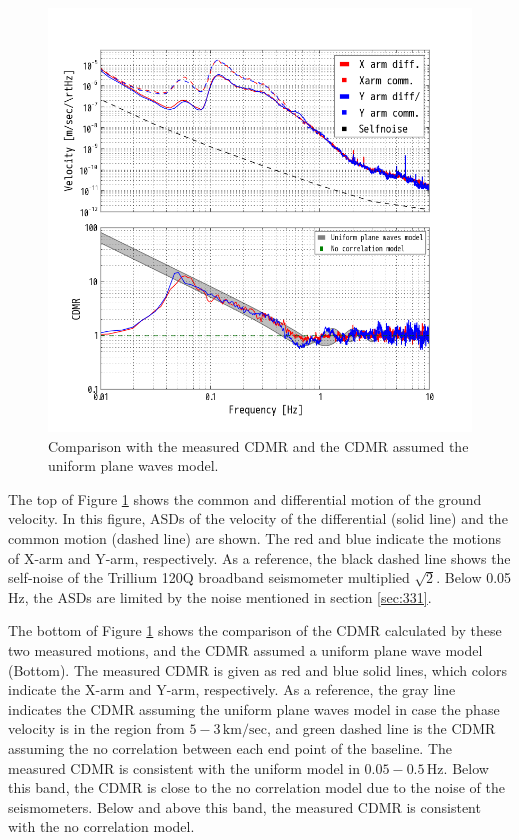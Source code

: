 \begin{figure}[h]
    \begin{center}   
      \includegraphics[width=13.0cm]{./img_chap3/img319.png}
      \caption{Comparison with the measured CDMR and the CDMR assumed the uniform plane waves model.}\label{img:img319}
    \end{center}
\end{figure}

The top of Figure \ref{img:img319} shows the common and differential motion of the ground velocity. In this figure, ASDs of the velocity of the differential (solid line) and the common motion (dashed line) are shown. The red and blue indicate the motions of X-arm and Y-arm, respectively. As a reference, the black dashed line shows the self-noise of the Trillium 120Q broadband seismometer multiplied $\sqrt{2}$. Below 0.05 Hz, the ASDs are limited by the noise mentioned in section \cref{sec:331}. 

The bottom of Figure \ref{img:img319} shows the comparison of the CDMR calculated by these two measured motions, and the CDMR assumed a uniform plane wave model (Bottom). The measured CDMR is given as red and blue solid lines, which colors indicate the X-arm and Y-arm, respectively. As a reference, the gray line indicates the CDMR assuming the uniform plane waves model in case the phase velocity is in the region from $5 - 3\,\mathrm{km/sec}$, and green dashed line is the CDMR assuming the no correlation between each end point of the baseline. The measured CDMR is consistent with the uniform model in $0.05 - 0.5\,\mathrm{Hz}$. Below this band, the CDMR is close to the no correlation model due to the noise of the seismometers. Below and above this band, the measured CDMR is consistent with the no correlation model.

